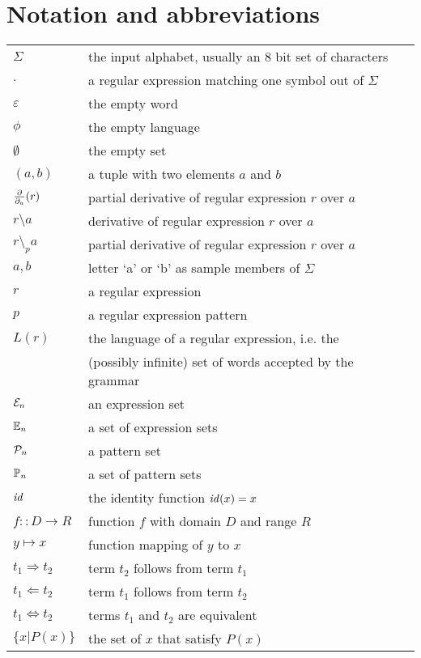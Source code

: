 \chapter*{Notation and abbreviations}


\begin{tabular}{ll}
   $\Sigma$ & the input alphabet, usually an 8 bit set of characters \\
   $.$ & a regular expression matching one symbol out of $\Sigma$ \\
   $\varepsilon$ & the empty word \\
   $\phi$ & the empty language \\
   $\emptyset$ & the empty set \\
   $(a,b)$ & a tuple with two elements $a$ and $b$ \\
   $\frac{\partial}{\partial_{a}}(r)$ & partial derivative of regular expression $r$ over $a$ \\
   $r \setminus a$ & derivative of regular expression $r$ over $a$ \\
   $r \setminus_p a$ & partial derivative of regular expression $r$ over $a$ \\
   $a, b$ & letter `a' or `b' as sample members of $\Sigma$ \\
   $r$ & a regular expression \\
   $p$ & a regular expression pattern \\
   $L(r)$ & the language of a regular expression, i.e. the \\
          & (possibly infinite) set of words accepted by the grammar \\
   $\mathcal{E}_n$ & an expression set \\
   $\mathbb{E}_n$ & a set of expression sets \\
   $\mathcal{P}_n$ & a pattern set \\
   $\mathbb{P}_n$ & a set of pattern sets \\
   $\mathit{id}$ & the identity function $\mathit{id}(x) = x$ \\
   $f :: D \to R$ & function $f$ with domain $D$ and range $R$ \\
   $y \mapsto x$ & function mapping of $y$ to $x$ \\
   $t_1 \Rightarrow t_2$ & term $t_2$ follows from term $t_1$ \\
   $t_1 \Leftarrow t_2$ & term $t_1$ follows from term $t_2$ \\
   $t_1 \Leftrightarrow t_2$ & terms $t_1$ and $t_2$ are equivalent \\
   $\{ x | P(x) \}$ & the set of $x$ that satisfy $P(x)$ \\
\end{tabular}


